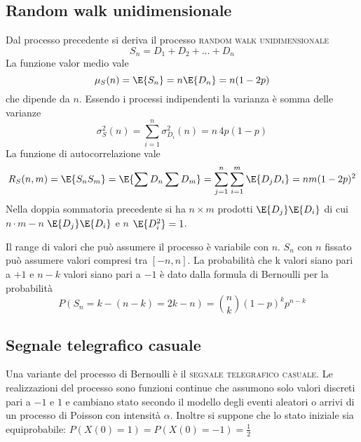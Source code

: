 \subsection{Random walk unidimensionale}
Dal processo precedente si deriva il processo \textsc{random walk unidimensionale}
\begin{equation}
	S_n=D_1+D_2+\dots+D_n
\end{equation}
La funzione valor medio vale
\begin{equation}
	\mu_S(n)=\E{S_n}=n\E{D_n}=n(1-2p)
\end{equation}
che dipende da $n$. Essendo i processi indipendenti la varianza è somma delle varianze
\begin{equation}
	\sigma^2_S(n)=\sum_{i=1}^{n}\sigma^2_{D_i}(n)=n\,4p(1-p)
\end{equation}
La funzione di autocorrelazione vale
\begin{equation}
	R_S(n,m)=\E{S_n S_m}=\E{\sum D_n \sum D_m}=\sum_{j=1}^{n}\sum_{i=1}^{m}\E{D_j D_i}=n m(1-2p)^2
\end{equation}
Nella doppia sommatoria precedente si ha $n\times m$ prodotti $\E{D_j}\E{D_i}$ di cui $n\cdot m-n$ $\E{D_j}\E{D_i}$ e $n$ $\E{D^2_i}=1$. 

Il range di valori che può assumere il processo è variabile con $n$. $S_n$ con $n$ fissato può assumere valori compresi tra $[-n,n]$. La probabilità che k valori siano pari a $+1$ e $n-k$ valori siano pari a $-1$ è dato dalla formula di Bernoulli per la probabilità
\[
	P(S_n=k-(n-k)=2k-n)=\binom{n}{k}(1-p)^k p^{n-k}
\]

\subsection{Segnale telegrafico casuale}
Una variante del processo di Bernoulli è il \textsc{segnale telegrafico casuale}. Le realizzazioni del processo sono funzioni continue che assumono solo valori discreti pari a $-1$ e $1$ e cambiano stato secondo il modello degli eventi aleatori o arrivi di un processo di Poisson con intensità $\alpha$. Inoltre si suppone che lo stato iniziale sia equiprobabile: $P(X(0)=1)=P(X(0)=-1)=\frac{1}{2}$

\begin{figure}[!htb]
	\centering
\end{figure}

